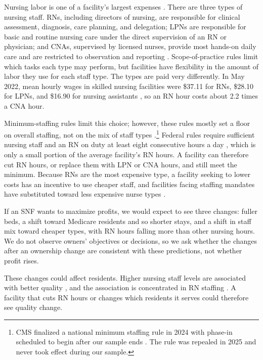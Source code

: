 \documentclass[12pt]{article}
\begin{document}
Nursing labor is one of a facility's largest expenses \citep{hawk_et_al_2022}. There are three types of nursing staff. RNs, including directors of nursing, are responsible for clinical assessment, diagnosis, care planning, and delegation; LPNs are responsible for basic and routine nursing care under the direct supervision of an RN or physician; and CNAs, supervised by licensed nurses, provide most hands-on daily care and are restricted to observation and reporting \citep{ncsbn2021model}. Scope-of-practice rules limit which tasks each type may perform, but facilities have flexibility in the amount of labor they use for each staff type. The types are paid very differently. In May 2022, mean hourly wages in skilled nursing facilities were \$37.11 for RNs, \$28.10 for LPNs, and \$16.90 for nursing assistants \citep{bls_oews_2022}, so an RN hour costs about 2.2 times a CNA hour.

Minimum-staffing rules limit this choice; however, these rules mostly set a floor on overall staffing, not on the mix of staff types \citep{grabowski_bowblis_2023, bowblis_ghattas_2017}.\footnote{CMS finalized a national minimum staffing rule in 2024 with phase-in scheduled to begin after our sample ends \citep{cms_2024_min_staffing}. The rule was repealed in 2025 \citep{cms_2025_staffing_repeal} and never took effect during our sample.} Federal rules require sufficient nursing staff and an RN on duty at least eight consecutive hours a day \citep{eCFR42CFR483.35}, which is only a small portion of the average facility's RN hours. A facility can therefore cut RN hours, or replace them with LPN or CNA hours, and still meet the minimum. Because RNs are the most expensive type, a facility seeking to lower costs has an incentive to use cheaper staff, and facilities facing staffing mandates have substituted toward less expensive nurse types \citep{bowblis_ghattas_2017}. 

If an SNF wants to maximize profits, we would expect to see three changes: fuller beds, a shift toward Medicare residents and so shorter stays, and a shift in staff mix toward cheaper types, with RN hours falling more than other nursing hours. We do not observe owners' objectives or decisions, so we ask whether the changes after an ownership change are consistent with these predictions, not whether profit rises.

These changes could affect residents. Higher nursing staff levels are associated with better quality \citep{harrington_et_al_2000, zhang_grabowski_2004}, and the association is concentrated in RN staffing \citep{lin_2014}. A facility that cuts RN hours or changes which residents it serves could therefore see quality change. 
\end{document}
